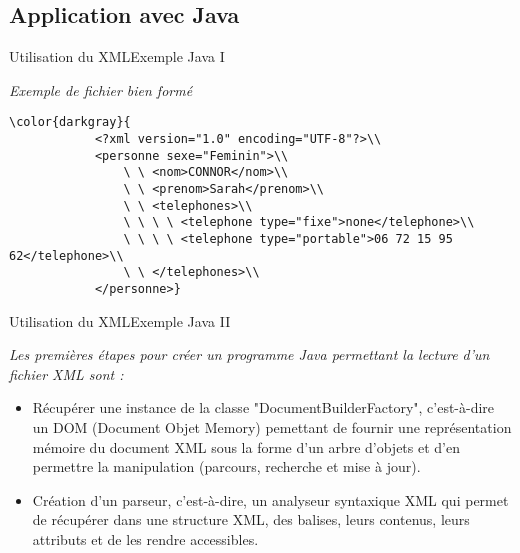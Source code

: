 \documentclass{beamer}
\begin{document}
    \subsection{Application avec Java}
    \begin{frame}{Utilisation du XML}{Exemple Java I}
       \begin{block}{
        \textit{Exemple de fichier bien formé}}
        \begin{verbatim}\color{darkgray}{
            <?xml version="1.0" encoding="UTF-8"?>\\
            <personne sexe="Feminin">\\
                \ \ <nom>CONNOR</nom>\\
                \ \ <prenom>Sarah</prenom>\\
                \ \ <telephones>\\
                \ \ \ \ <telephone type="fixe">none</telephone>\\
                \ \ \ \ <telephone type="portable">06 72 15 95 62</telephone>\\
                \ \ </telephones>\\
            </personne>}
        \end{verbatim}
       \end{block}
    \end{frame}
    
    \begin{frame}{Utilisation du XML}{Exemple Java II}
       \begin{block}{
        \textit{Les premières étapes pour créer un programme Java permettant la lecture d'un fichier XML sont :}}
        \begin{itemize}
            \item Récupérer une instance de la classe "DocumentBuilderFactory", c'est-à-dire un DOM (Document Objet Memory) pemettant de fournir une représentation mémoire du document XML sous la forme d'un arbre d'objets et d'en permettre la manipulation (parcours, recherche et mise à jour).\pause
            \item
            Création d'un parseur, c'est-à-dire, un analyseur syntaxique XML qui permet de récupérer dans une structure XML, des balises, leurs contenus, leurs attributs et de les rendre accessibles. 
        \end{itemize}
       \end{block}
    \end{frame}
    
\end{document}
